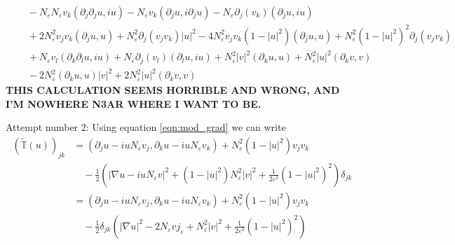 \documentclass[a4paper]{article}
\begin{document}
\begin{align}
  &\quad - N_\varepsilon N_\varepsilon v_k (\partial_j \partial_j u, iu) - N_\varepsilon v_k (\partial_j u, i \partial_j u) - N_\varepsilon \partial_j
  (v_k) (\partial_j u, iu) \nonumber \\
  &\quad + 2 N_\varepsilon^2 v_j v_k (\partial_j u, u) + N_\varepsilon^2 \partial_j (v_j v_k) |u|^2 - 4 N_\varepsilon^2 v_j v_k (1-|u|^2) (\partial_j
  u, u) + N_\varepsilon^2 (1-|u|^2)^2 \partial_j (v_j v_k) \nonumber \\
  &\quad + N_\varepsilon v_l (\partial_k \partial_l u, iu) + N_\varepsilon \partial_j (v_l) (\partial_l u, iu) + N_\varepsilon^2 |v|^2 (\partial_k u,
  u) + N_\varepsilon^2 |u|^2 (\partial_k v, v) \nonumber \\
  &\quad - 2 N_\varepsilon^2 (\partial_k u, u) |v|^2 + 2 N_\varepsilon^2 |u|^2 (\partial_k v, v)
  \label{eqn:div_mod_stress_energy_wrong}
\end{align}
\textbf{THIS CALCULATION SEEMS HORRIBLE AND WRONG, AND I'M NOWHERE N3AR WHERE I WANT TO BE.}

Attempt number 2:
Using equation \eqref{eqn:mod_grad} we can write
\begin{align}
  (\tilde{\mathbb{T}}(u))_{jk} &= ( \partial_j u - i u N_\varepsilon v_j, \partial_k u - iu N_\varepsilon v_k) + N_\varepsilon^2(1-|u|^2)v_j v_k
  \nonumber \\
  &\quad - \frac{1}{2} \left( |\nabla u - iu N_\varepsilon v|^2 + (1-|u|^2) N_\varepsilon^2 |v|^2 + \frac{1}{2 \varepsilon^2} (1-|u|^2)^2 \right)
  \delta_{jk} \nonumber \\
  &= (\partial_j u - i u N_\varepsilon v_j, \partial_k u - i u N_\varepsilon v_k ) + N_\varepsilon^2(1-|u|^2) v_j v_k \nonumber \\
  &\quad -\frac{1}{2} \delta_{jk} \left( |\nabla u|^2 - 2N_\varepsilon v j_\varepsilon + N_\varepsilon^2 |v|^2 + \frac{1}{2 \varepsilon^2} (1-|u|^2)^2 \right)
  \label{eqn:mod_stress_energy2}
\end{align}
\end{document}
